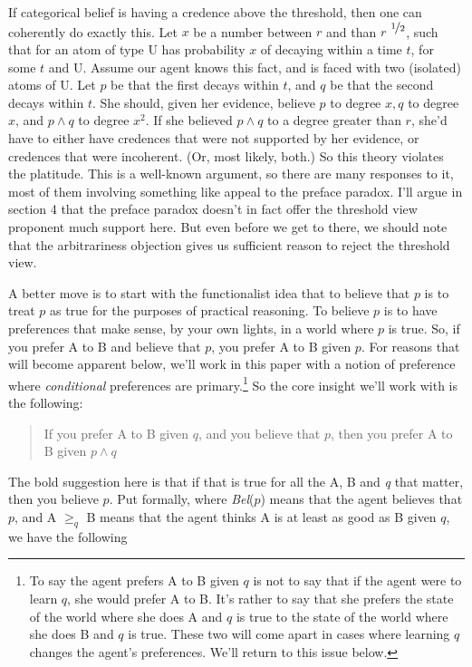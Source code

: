 \noindent If categorical belief is having a credence above the threshold, then one can coherently do exactly this. Let \(x\) be a number between \(r\) and than \(r\)\textsuperscript{ \(\nicefrac{1}{2}\)}, such that for an atom of type U has probability \(x\) of decaying within a time \(t\), for some \(t\) and U. Assume our agent knows this fact, and is faced with two (isolated) atoms of U. Let \(p\) be that the first decays within \(t\), and \(q\) be that the second decays within \(t\). She should, given her evidence, believe \(p\) to degree \(x, q\) to degree \(x\), and \(p \wedge q\) to degree \(x ^2\). If she believed \(p \wedge q\) to a degree greater than \(r\), she'd have to either have credences that were not supported by her evidence, or credences that were incoherent. (Or, most likely, both.) So this theory violates the platitude. This is a well-known argument, so there are many responses to it, most of them involving something like appeal to the preface paradox. I'll argue in section 4 that the preface paradox doesn't in fact offer the threshold view proponent much support here. But even before we get to there, we should note that the arbitrariness objection gives us sufficient reason to reject the threshold view.

A better move is to start with the functionalist idea that to believe that \(p\) is to treat \(p\) as true for the purposes of practical reasoning. To believe \(p\) is to have preferences that make sense, by your own lights, in a world where \(p\) is true. So, if you prefer A to B and believe that \(p\), you prefer A to B given \(p\). For reasons that will become apparent below, we'll work in this paper with a notion of preference where \textit{conditional} preferences are primary.\footnote{To say the agent prefers A to B given \(q\) is not to say that if the agent were to learn \(q\), she would prefer A to B. It's rather to say that she prefers the state of the world where she does A and \(q\) is true to the state of the world where she does B and \(q\) is true. These two will come apart in cases where learning \(q\) changes the agent's preferences. We'll return to this issue below.} So the core insight we'll work with is the following:

\begin{quote}
If you prefer A to B given \(q\), and you believe that \(p\), then you prefer A to B given \(p \wedge q\)
\end{quote}

\noindent The bold suggestion here is that if that is true for all the A, B and \textit{q }that matter, then you believe \(p\). Put formally, where \textit{Bel}(\(p\)) means that the agent believes that \(p\), and A \(\geq _q\) B means that the agent thinks A is at least as good as B given \(q\), we have the following

